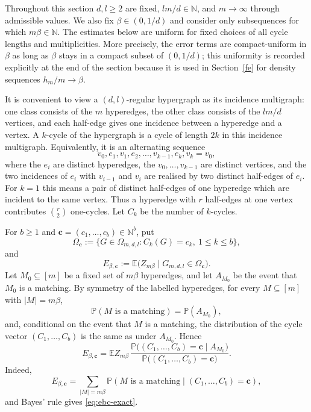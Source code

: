 \documentclass[11pt]{amsart}
\theoremstyle{plain}
\numberwithin{equation}{section}
\numberwithin{theorem}{section}
\numberwithin{figure}{section}
\begin{document}
Throughout this section \(d,l\ge2\) are fixed, \(lm/d\in\mathbb N\), and
\(m\to\infty\) through admissible values.  We also fix
\(\beta\in(0,1/d)\) and consider only subsequences for which \(m\beta\in\mathbb N\).
The estimates below are uniform for fixed choices of all cycle lengths and
multiplicities.  More precisely, the error terms are compact-uniform in
\(\beta\) as long as \(\beta\) stays in a compact subset of \((0,1/d)\); this
uniformity is recorded explicitly at the end of the section because it is used
in Section~\ref{fe} for density sequences \(h_m/m\to\beta\).

It is convenient to view a \((d,l)\)-regular hypergraph as its incidence
multigraph: one class consists of the \(m\) hyperedges, the other class consists
of the \(lm/d\) vertices, and each half-edge gives one incidence between a
hyperedge and a vertex.  A \(k\)-cycle of the hypergraph is a cycle of length
\(2k\) in this incidence multigraph.  Equivalently, it is an alternating sequence
\[
  v_0,e_1,v_1,e_2,\ldots,v_{k-1},e_k,v_k=v_0,
\]
where the \(e_i\) are distinct hyperedges, the \(v_0,\ldots,v_{k-1}\) are distinct
vertices, and the two incidences of \(e_i\) with \(v_{i-1}\) and \(v_i\) are realised
by two distinct half-edges of \(e_i\).  For \(k=1\) this means a pair of distinct
half-edges of one hyperedge which are incident to the same vertex.  Thus a
hyperedge with \(r\) half-edges at one vertex contributes \(\binom r2\) one-cycles.
Let \(C_k\) be the number of \(k\)-cycles.

For \(b\ge1\) and \(\mathbf c=(c_1,\ldots,c_b)\in\mathbb N^b\), put
\[
  \Omega_{\mathbf c}
  :=\{G\in\Omega_{m,d,l}: C_k(G)=c_k,\ 1\le k\le b\},
\]
and
\[
  E_{\beta,\mathbf c}
  :=\mathbb E\bigl(Z_{m\beta}\mid G_{m,d,l}\in\Omega_{\mathbf c}\bigr).
\]
Let \(M_0\subseteq[m]\) be a fixed set of \(m\beta\) hyperedges, and let
\(A_{M_0}\) be the event that \(M_0\) is a matching.  By symmetry of the labelled
hyperedges, for every \(M\subseteq[m]\) with \(|M|=m\beta\),
\[
  \mathbb P(M\text{ is a matching})=\mathbb P(A_{M_0}),
\]
and, conditional on the event that \(M\) is a matching, the distribution of the
cycle vector \((C_1,\ldots,C_b)\) is the same as under \(A_{M_0}\).  Hence
\begin{equation}\label{eq:ebc-exact}
  E_{\beta,\mathbf c}
  =\mathbb E Z_{m\beta}\,
    \frac{\mathbb P\bigl((C_1,\ldots,C_b)=\mathbf c\mid A_{M_0}\bigr)}
         {\mathbb P\bigl((C_1,\ldots,C_b)=\mathbf c\bigr)}.
\end{equation}
Indeed,
\[
  E_{\beta,\mathbf c}
  =\sum_{|M|=m\beta}\mathbb P(M\text{ is a matching}
     \mid (C_1,\ldots,C_b)=\mathbf c),
\]
and Bayes' rule gives \eqref{eq:ebc-exact}.
\end{document}
